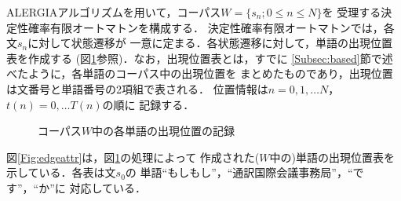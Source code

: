 \hspace{0.5mm}ALERGIA\hspace{0.5mm}アルゴリズムを用いて，コーパス\(W=\{s_n; 0\le n \le N\}\)を
受理する決定性確率有限オートマトンを構成する．
決定性確率有限オートマトンでは，各文\hspace{-0.2mm}$s_n$\hspace{-0.2mm}に対して状態遷移が
一意に定まる．各状態遷移に対して，単語の出現位置表を作成する
(図\ref{Fig:inlearn}参照)．なお，出現位置表とは，すでに
\ref{Subsec:based}節で述べたように，各単語のコーパス中の出現位置を
まとめたものであり，出現位置は文番号と単語番号の2項組で表される．
位置情報は\(n=0,1,\ldots N\)，\(t(n)=0,\ldots T(n)\)の順に
記録する．
\begin{figure}[hbt]
\begin{center}
\end{center}
\caption{コーパス$W$中の各単語の出現位置の記録}
\label{Fig:inlearn}
\end{figure}
図\ref{Fig:edgeattr}は，図\ref{Fig:inlearn}の処理によって
作成された($W$中の)単語の出現位置表を示している．各表は文$s_0$の
単語``もしもし''，``通訳国際会議事務局''，``です''，``か''に
対応している．
